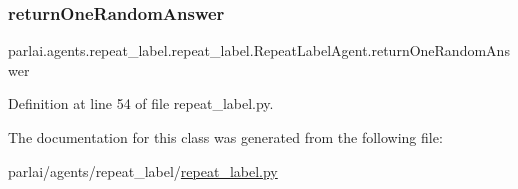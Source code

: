 \subsubsection{\texorpdfstring{return\+One\+Random\+Answer}{returnOneRandomAnswer}}
{\footnotesize\ttfamily parlai.\+agents.\+repeat\+\_\+label.\+repeat\+\_\+label.\+Repeat\+Label\+Agent.\+return\+One\+Random\+Answer}



Definition at line 54 of file repeat\+\_\+label.\+py.



The documentation for this class was generated from the following file\+:\begin{DoxyCompactItemize}
\item 
parlai/agents/repeat\+\_\+label/\hyperlink{repeat__label_8py}{repeat\+\_\+label.\+py}\end{DoxyCompactItemize}
